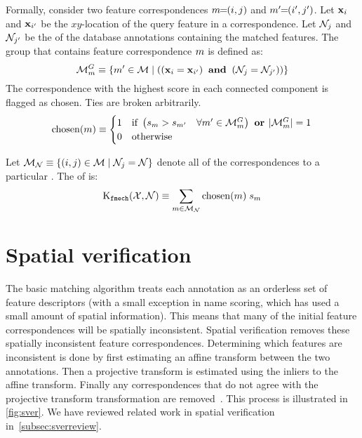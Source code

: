             \newcommand{\MatchesGroup}{\Matches^{G}}

            Formally, consider two feature correspondences $m\mkern-6mu=\mkern-6mu(i, j)$ and $m'\mkern-6mu=\mkern-6mu(i', j')$.
            Let $\mathbf{x}_{i}$ and $\mathbf{x}_{i'}$ be the $xy$-location of the query feature in a correspondence. Let
            $\mathcal{N}_{j}$ and $\mathcal{N}_{j'}$ be the \name{} of the database annotations containing the matched
            features. The group that contains feature correspondence $m$ is defined as:
            \begin{equation}
                \MatchesGroup_{\mI} \eqv \curly{\mII \in \Matches  \where
                \paren{
                    \paren{\pt_{\iI} \eq \pt_{\iII}} \AND 
                    \paren{\nid_{\jI} \eq \nid_{\jII}}
                }
            }
            \end{equation}
            The correspondence with the highest score in each connected component is flagged as chosen. Ties are
            broken arbitrarily.
            \begin{equation}
                \ischosen(\mI) \eqv 
                \bincase{
                \paren{
                    \fs_{\mI} > \fs_{\mII} 
                    \quad \forall \mII  \in \MatchesGroup_{\mI}
                } 
                \OR
                \card{\MatchesGroup_{\mI}} \eq 1
                }
            \end{equation}

            Let $\mathcal{M}_{\mathcal{N}} \equiv \{(i, j) \in \mathcal{M} \mid
              \mathcal{N}_j = \mathcal{N}\}$ denote all of the correspondences to a particular
              \name{}.
            The \nscore{} of \aan{\name{}} is:
            \begin{equation}
                \operatorname{K_{{\tt{fmech}}}}(\mathcal{X}, \mathcal{N}) 
                \equiv 
                \sum_{m \in \mathcal{M}_{\mathcal{N}}} \operatorname{chosen}(m) \; s_m
            \end{equation}

            \namematch{}


\FloatBarrier{}
\section{Spatial verification}\label{sec:sver}

    The basic matching algorithm treats each annotation as an orderless set of feature descriptors (with a small
    exception in name scoring, which has used a small amount of spatial information). This means that many of the
    initial feature correspondences will be spatially inconsistent. Spatial verification removes these spatially
    inconsistent feature correspondences. Determining which features are inconsistent is done by first estimating
    an affine transform between the two annotations. Then a projective transform is estimated using the inliers to
    the affine transform. Finally any correspondences that do not agree with the projective transform
    transformation are removed~\cite{fischler_random_1981, philbin_object_2007}. This process is illustrated in
    \cref{fig:sver}. We have reviewed related work in spatial verification in~\cref{subsec:sverreview}.

